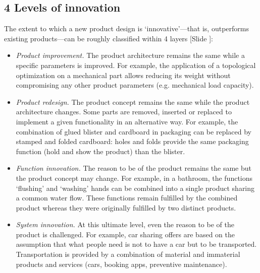 \documentclass{article}
\newcounter{slide}
\begin{document}
\subsection{4 Levels of innovation}
\label{sec:fourlevels}
The extent to which a new product design is `innovative'---that is, outperforms existing products---can be roughly classified within 4 layers  {\color{blue}[Slide ]}\cite{bhamraEcodesignSearchNew2004}:
\begin{itemize}
	\item \emph{Product improvement.} The product architecture remains the same while a specific parameters is improved. For example, the application of a topological optimization on a mechanical part allows reducing its weight without compromising any other product parameters (e.g. mechanical load capacity).
	\item \emph{Product redesign.} The product concept remains the same while the product architecture changes. Some parts are removed, inserted or replaced to implement a given functionality in an alternative way. For example, the combination of glued blister and cardboard in packaging can be replaced by stamped and folded cardboard: holes and folds provide the same packaging function (hold and show the product) than the blister. 
	\item \emph{Function innovation.} The reason to be of the product remains the same but the product concept may change. For example, in a bathroom, the functions `flushing' and `washing' hands can be combined into a single product sharing a common water flow. These functions remain fulfilled by the combined product whereas they were originally fulfilled by two distinct products.
	\item \emph{System innovation.} At this ultimate level, even the reason to be of the product is challenged. For example, car sharing offers are based on the assumption that what people need is not to have a car but to be transported. Transportation is provided by a combination of material and immaterial products and services (cars, booking apps, preventive maintenance).
\end{itemize}
\end{document}
